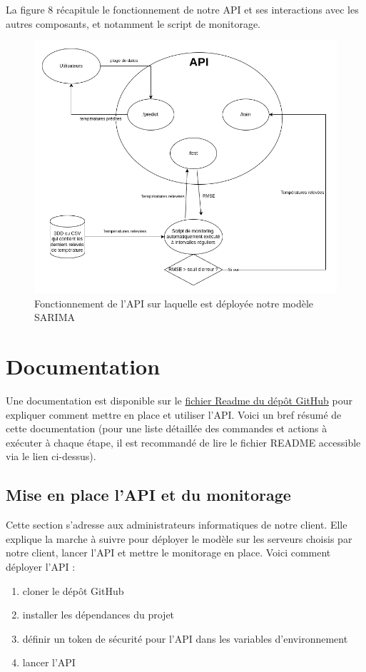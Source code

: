 \documentclass[french]{article}
\begin{document}
    



    La figure 8 récapitule le fonctionnement de notre API et ses interactions avec les autres composants, et notamment le script de monitorage.
    \begin{figure}[h]
        \includegraphics[width=12cm]{schema_API_E2}
        \centering
        \caption{Fonctionnement de l'API sur laquelle est déployée notre modèle SARIMA}
        \centering
    \end{figure}

    \section{Documentation}

    Une documentation est disponible sur le \href{https://github.com/vinpap/predict_climate_change}{fichier Readme du dépôt GitHub} pour expliquer comment mettre en place et utiliser l'API. Voici un bref résumé de cette documentation (pour une liste détaillée des commandes et actions à exécuter à chaque étape, il est recommandé de lire le fichier README accessible via le lien ci-dessus).
    \label{sec:deployment}
    \subsection{Mise en place l'API et du monitorage}

    Cette section s'adresse aux administrateurs informatiques de notre client. Elle explique la marche à suivre pour déployer le modèle sur les serveurs choisis par notre client, lancer l'API et mettre le monitorage en place. Voici comment déployer l'API :
    \begin{enumerate}
        \item cloner le dépôt GitHub
        \item installer les dépendances du projet
        \item définir un token de sécurité pour l'API dans les variables d'environnement
        \item lancer l'API
    \end{enumerate}
\end{document}
